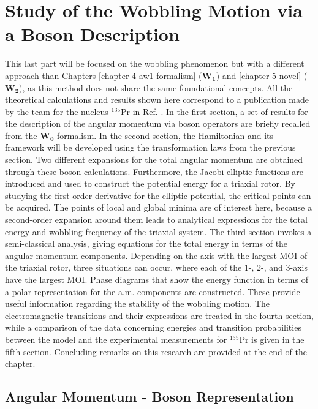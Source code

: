 \chapter{Study of the Wobbling Motion via a Boson Description}
\label{extra-chapter-new-boson}

This last part will be focused on the wobbling phenomenon but with a different approach than Chapters \ref{chapter-4-aw1-formalism} ($\mathbf{W_1}$) and \ref{chapter-5-novel} ($\mathbf{W_2}$), as this method does not share the same foundational concepts. All the theoretical calculations and results shown here correspond to a publication made by the team for the nucleus $^{135}$Pr in Ref. \cite{raduta2020new}. In the first section, a set of results for the description of the angular momentum via boson operators are briefly recalled from the $\mathbf{W_0}$ formalism. In the second section, the Hamiltonian and its framework will be developed using the transformation laws from the previous section. Two different expansions for the total angular momentum are obtained through these boson calculations. Furthermore, the Jacobi elliptic functions are introduced and used to construct the potential energy for a triaxial rotor. By studying the first-order derivative for the elliptic potential, the critical points can be acquired. The points of local and global minima are of interest here, because a second-order expansion around them leads to analytical expressions for the total energy and wobbling frequency of the triaxial system. The third section invokes a semi-classical analysis, giving equations for the total energy in terms of the angular momentum components. Depending on the axis with the largest MOI of the triaxial rotor, three situations can occur, where each of the $1$-, $2$-, and $3$-axis have the largest MOI. Phase diagrams that show the energy function in terms of a polar representation for the a.m. components are constructed. These provide useful information regarding the stability of the wobbling motion. The electromagnetic transitions and their expressions are treated in the fourth section, while a comparison of the data concerning energies and transition probabilities between the model and the experimental measurements for $^{135}$Pr is given in the fifth section. Concluding remarks on this research are provided at the end of the chapter.

\section{Angular Momentum - Boson Representation}
\label{section-intro-boson-representation}

